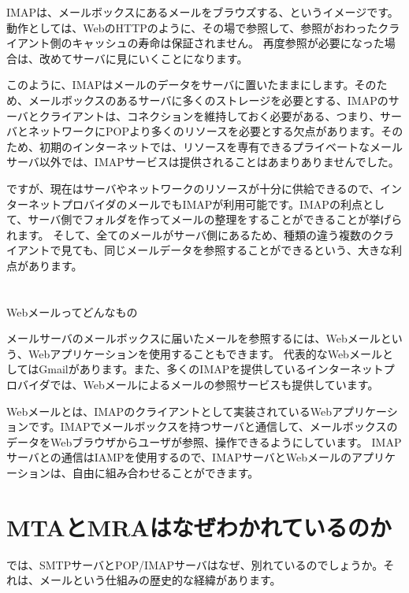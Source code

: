 IMAPは、メールボックスにあるメールをブラウズする、というイメージです。動作としては、WebのHTTPのように、その場で参照して、参照がおわったクライアント側のキャッシュの寿命は保証されません。
再度参照が必要になった場合は、改めてサーバに見にいくことになります。

このように、IMAPはメールのデータをサーバに置いたままにします。そのため、メールボックスのあるサーバに多くのストレージを必要とする、IMAPのサーバとクライアントは、コネクションを維持しておく必要がある、つまり、サーバとネットワークにPOPより多くのリソースを必要とする欠点があります。そのため、初期のインターネットでは、リソースを専有できるプライベートなメールサーバ以外では、IMAPサービスは提供されることはあまりありませんでした。

ですが、現在はサーバやネットワークのリソースが十分に供給できるので、インターネットプロバイダのメールでもIMAPが利用可能です。IMAPの利点として、サーバ側でフォルダを作ってメールの整理をすることができることが挙げられます。
そして、全てのメールがサーバ側にあるため、種類の違う複数のクライアントで見ても、同じメールデータを参照することができるという、大きな利点があります。

\section*{}
\begin{itembox}[l]{Webメールってどんなもの}

メールサーバのメールボックスに届いたメールを参照するには、Webメールという、Webアプリケーションを使用することもできます。
代表的なWebメールとしてはGmailがあります。また、多くのIMAPを提供しているインターネットプロバイダでは、Webメールによるメールの参照サービスも提供しています。

Webメールとは、IMAPのクライアントとして実装されているWebアプリケーションです。IMAPでメールボックスを持つサーバと通信して、メールボックスのデータをWebブラウザからユーザが参照、操作できるようにしています。
IMAPサーバとの通信はIAMPを使用するので、IMAPサーバとWebメールのアプリケーションは、自由に組み合わせることができます。

\end{itembox}

\section{MTAとMRAはなぜわかれているのか}

では、SMTPサーバとPOP/IMAPサーバはなぜ、別れているのでしょうか。それは、メールという仕組みの歴史的な経緯があります。

